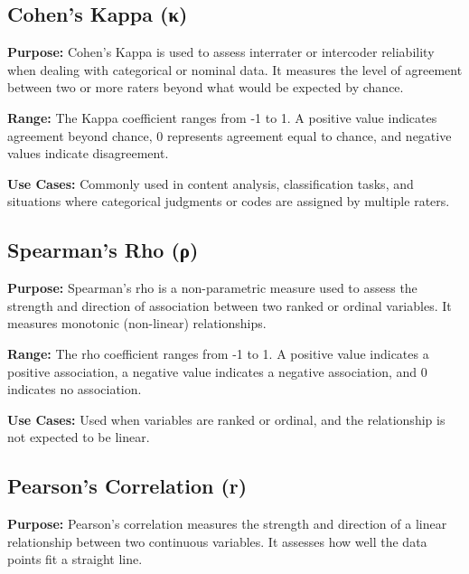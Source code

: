 \documentclass[
  b5paper]{book}
\begin{document}
\hypertarget{cohens-kappa-ux3ba}{%
\subsection*{\texorpdfstring{\textbf{Cohen's Kappa (κ)}}{Cohen's Kappa (κ)}}\label{cohens-kappa-ux3ba}}

\textbf{Purpose:} Cohen's Kappa is used to assess interrater or intercoder reliability when dealing with categorical or nominal data. It measures the level of agreement between two or more raters beyond what would be expected by chance.

\textbf{Range:} The Kappa coefficient ranges from -1 to 1. A positive value indicates agreement beyond chance, 0 represents agreement equal to chance, and negative values indicate disagreement.

\textbf{Use Cases:} Commonly used in content analysis, classification tasks, and situations where categorical judgments or codes are assigned by multiple raters.

\hypertarget{spearmans-rho-ux3c1}{%
\subsection*{\texorpdfstring{\textbf{Spearman's Rho (ρ)}}{Spearman's Rho (ρ)}}\label{spearmans-rho-ux3c1}}

\textbf{Purpose:} Spearman's rho is a non-parametric measure used to assess the strength and direction of association between two ranked or ordinal variables. It measures monotonic (non-linear) relationships.

\textbf{Range:} The rho coefficient ranges from -1 to 1. A positive value indicates a positive association, a negative value indicates a negative association, and 0 indicates no association.

\textbf{Use Cases:} Used when variables are ranked or ordinal, and the relationship is not expected to be linear.

\hypertarget{pearsons-correlation-r}{%
\subsection*{\texorpdfstring{\textbf{Pearson's Correlation (r)}}{Pearson's Correlation (r)}}\label{pearsons-correlation-r}}

\textbf{Purpose:} Pearson's correlation measures the strength and direction of a linear relationship between two continuous variables. It assesses how well the data points fit a straight line.
\end{document}
